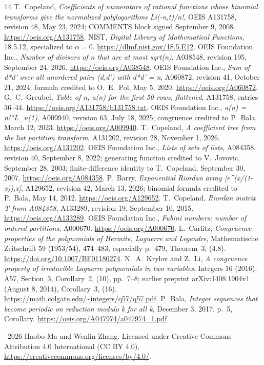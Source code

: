 \documentclass[11pt]{article}
\begin{document}
\begin{thebibliography}{14}
 T.~Copeland, \emph{Coefficients of numerators of rational
functions whose binomial transforms give the normalized polylogarithms
Li(-n,t)/n!}, OEIS A131758, revision 48, May 23, 2024; COMMENTS block
signed September 9, 2008. \url{https://oeis.org/A131758}.
 NIST, \emph{Digital Library of Mathematical Functions},
18.5.12, specialized to $\alpha=0$. \url{https://dlmf.nist.gov/18.5.E12}.
 OEIS Foundation Inc., \emph{Number of divisors of n that
are at most sqrt(n)}, A038548, revision 195, September 24, 2026.
\url{https://oeis.org/A038548}.
 OEIS Foundation Inc., \emph{Sum of d*d' over all unordered
pairs (d,d') with d*d' = n}, A060872, revision 41, October 21, 2024;
formula credited to O.~E.~Pol, May 5, 2020. \url{https://oeis.org/A060872}.
 G.~C.~Greubel, \emph{Table of n, a(n) for the first 50 rows,
flattened}, A131758, entries 36--44.
\url{https://oeis.org/A131758/b131758.txt}.
 OEIS Foundation Inc., \emph{a(n) = n!*L\_n(1)},
A009940, revision 63, July 18, 2025; congruence credited to P.~Bala,
March 12, 2023. \url{https://oeis.org/A009940}.
 T.~Copeland, \emph{A coefficient tree from the list
partition transform}, A131202, revision 28, November 1, 2026.
\url{https://oeis.org/A131202}.
 OEIS Foundation Inc., \emph{Lists of sets of lists}, A084358,
revision 40, September 8, 2022; generating function credited to V.~Jovovic,
September 28, 2003; finite-difference identity to T.~Copeland,
September 30, 2007. \url{https://oeis.org/A084358}.
 P.~Barry, \emph{Exponential Riordan array
[e\^{}(x/(1-x)),x]}, A129652, revision 42, March 13, 2026; binomial
formula credited to P.~Bala, May 14, 2012. \url{https://oeis.org/A129652}.
 T.~Copeland, \emph{Riordan matrix T from A084358},
A133289, revision 19, September 10, 2015. \url{https://oeis.org/A133289}.
 OEIS Foundation Inc., \emph{Fubini numbers: number of
ordered partitions}, A000670. \url{https://oeis.org/A000670}.
 L.~Carlitz, \emph{Congruence properties of the polynomials
of Hermite, Laguerre and Legendre}, Mathematische Zeitschrift 59
(1953/54), 474--483, especially p.~479, Theorem~3, (4.8).
\url{https://doi.org/10.1007/BF01180274}.
 N.~A.~Krylov and Z.~Li, \emph{A congruence property of
irreducible Laguerre polynomials in two variables}, Integers 16 (2016),
A57, Section~3, Corollary~2, (10), pp.~7--8; earlier preprint
arXiv:1408.1904v1 (August 8, 2014), Corollary~3, (16).
\url{https://math.colgate.edu/~integers/q57/q57.pdf}.
 P.~Bala, \emph{Integer sequences that become periodic on
reduction modulo k for all k}, December 3, 2017, p.~5, Corollary.
\url{https://oeis.org/A047974/a047974_1.pdf}.
\end{thebibliography}
\noindent\small\textcopyright\ 2026 Haobo Ma and Wenlin Zhang.
Licensed under Creative Commons Attribution 4.0 International (CC BY 4.0),
\url{https://creativecommons.org/licenses/by/4.0/}.
\end{document}
